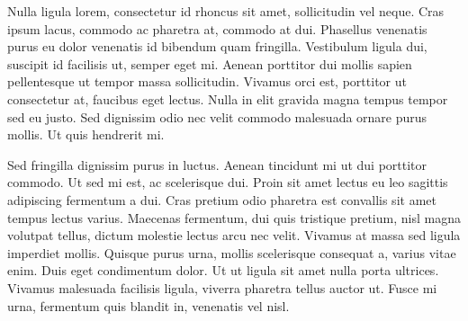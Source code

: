 \documentclass[oneside,11pt]{Classes/PhDthesisPSnPDF}
\begin{document}
\cleardoublepage

\begin{zusamm}
 Nulla ligula lorem, consectetur id rhoncus sit amet, sollicitudin vel neque. Cras ipsum lacus, commodo ac pharetra at, commodo at dui. Phasellus venenatis purus eu dolor venenatis id bibendum quam fringilla. Vestibulum ligula dui, suscipit id facilisis ut, semper eget mi. Aenean porttitor dui mollis sapien pellentesque ut tempor massa sollicitudin. Vivamus orci est, porttitor ut consectetur at, faucibus eget lectus. Nulla in elit gravida magna tempus tempor sed eu justo. Sed dignissim odio nec velit commodo malesuada ornare purus mollis. Ut quis hendrerit mi.

Sed fringilla dignissim purus in luctus. Aenean tincidunt mi ut dui porttitor commodo. Ut sed mi est, ac scelerisque dui. Proin sit amet lectus eu leo sagittis adipiscing fermentum a dui. Cras pretium odio pharetra est convallis sit amet tempus lectus varius. Maecenas fermentum, dui quis tristique pretium, nisl magna volutpat tellus, dictum molestie lectus arcu nec velit. Vivamus at massa sed ligula imperdiet mollis. Quisque purus urna, mollis scelerisque consequat a, varius vitae enim. Duis eget condimentum dolor. Ut ut ligula sit amet nulla porta ultrices. Vivamus malesuada facilisis ligula, viverra pharetra tellus auctor ut. Fusce mi urna, fermentum quis blandit in, venenatis vel nisl.

\end{zusamm}


\setcounter{secnumdepth}{3} %
\setcounter{tocdepth}{3}    %
\tableofcontents            %


\newpage
\mainmatter
\newpage























\newpage
\end{document}
